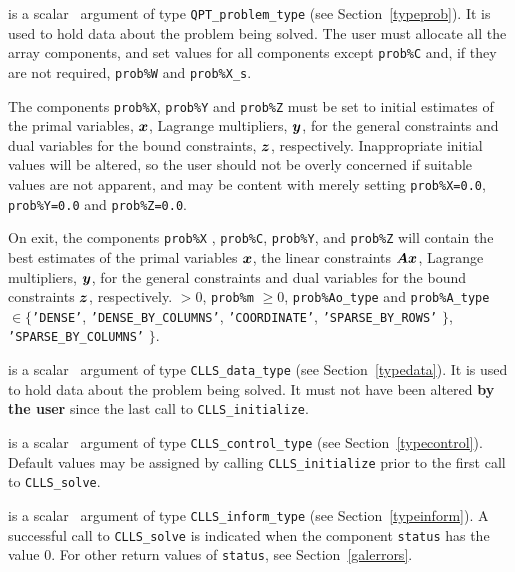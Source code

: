 \documentclass{galahad}
\newcommand{\packagename}{CLLS}
\begin{document}
\begin{description}
 is a scalar \intentinout\ argument of type
{\tt QPT\_problem\_type}
(see Section~\ref{typeprob}).
It is used to hold data about the problem being solved.
The user must allocate all the array components,
and set values for all components except {\tt prob\%C}
and, if they are not required, {\tt prob\%W} and {\tt prob\%X\_s}.

The components {\tt prob\%X}, {\tt prob\%Y} and {\tt prob\%Z}
must be set to initial estimates of the primal variables, ${\bm{x}}$,
Lagrange multipliers, ${\bm{y}}$, for the general constraints
and dual variables for the bound constraints, ${\bm{z}}$, respectively.
Inappropriate initial values will be altered, so the user should
not be overly concerned if suitable values are not apparent, and may be
content with merely setting {\tt prob\%X=0.0}, {\tt prob\%Y=0.0}
and {\tt prob\%Z=0.0}.

On exit, the components {\tt prob\%X} , {\tt prob\%C}, {\tt prob\%Y},
and {\tt prob\%Z}
will contain the best estimates of the primal variables ${\bm{x}}$,
the linear constraints ${\bm{A}} {\bm{x}}$,
Lagrange multipliers, ${\bm{y}}$, for the general constraints
and dual variables for the bound constraints ${\bm{z}}$, respectively.
 $> 0$, {\tt prob\%m} $\geq 0$,
 {\tt prob\%Ao\_type} and {\tt prob\%A\_type} $\in \{${\tt 'DENSE'},
 {\tt 'DENSE\_BY\_COLUMNS'},
 {\tt 'COORDINATE'}, {\tt 'SPARSE\_BY\_\-ROWS'} $\}$,
 {\tt 'SPARSE\_BY\_\-COLUMNS'} $\}$.

 is a scalar \intentinout\ argument of type
{\tt \packagename\_data\_type}
(see Section~\ref{typedata}). It is used to hold data about the problem being
solved. It must not have been altered {\bf by the user} since the last call to
{\tt \packagename\_initialize}.

 is a scalar \intentin\ argument of type
{\tt \packagename\_control\_type}
(see Section~\ref{typecontrol}). Default values may be assigned by calling
{\tt \packagename\_initialize} prior to the first call to
{\tt \packagename\_solve}.

 is a scalar \intentinout\ argument of type
{\tt \packagename\_inform\_type}
(see Section~\ref{typeinform}).
A successful call to
{\tt \packagename\_solve}
is indicated when the  component {\tt status} has the value 0.
For other return values of {\tt status}, see Section~\ref{galerrors}.

\end{description}
\end{document}
